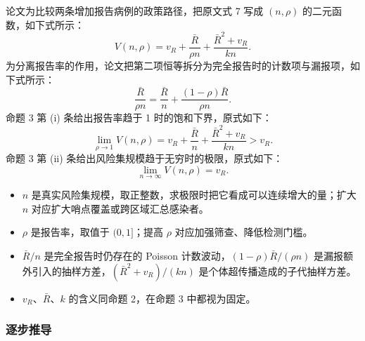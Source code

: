 论文为比较两条增加报告病例的政策路径，把原文式 7 写成 $(n,\rho)$ 的二元函数，如下式所示：
\begin{equation*}
V(n, \rho) = v_R + \frac{\bar{R}}{\rho n} + \frac{\bar{R}^2 + v_R}{k n}.
\tag{原文式 10}
\end{equation*}
为分离报告率的作用，论文把第二项恒等拆分为完全报告时的计数项与漏报项，如下式所示：
\begin{equation*}
\frac{\bar{R}}{\rho n} = \frac{\bar{R}}{n} + \frac{(1-\rho)\bar{R}}{\rho n}.
\tag{原文式 11}
\end{equation*}
命题 3 第 (i) 条给出报告率趋于 1 时的饱和下界，原式如下：
\begin{equation*}
\lim_{\rho \to 1} V(n, \rho) = v_R + \frac{\bar{R}}{n} + \frac{\bar{R}^2 + v_R}{k n} > v_R.
\tag{原文式 12}
\end{equation*}
命题 3 第 (ii) 条给出风险集规模趋于无穷时的极限，原式如下：
\begin{equation*}
\lim_{n \to \infty} V(n, \rho) = v_R.
\tag{原文式 13}
\end{equation*}

\begin{itemize}
\item $n$ 是真实风险集规模，取正整数，求极限时把它看成可以连续增大的量；扩大 $n$ 对应扩大哨点覆盖或跨区域汇总感染者。
\item $\rho$ 是报告率，取值于 $(0,1]$；提高 $\rho$ 对应加强筛查、降低检测门槛。
\item $\bar R/n$ 是完全报告时仍存在的 Poisson 计数波动，$(1-\rho)\bar R/(\rho n)$ 是漏报额外引入的抽样方差，$(\bar R^2+v_R)/(kn)$ 是个体超传播造成的子代抽样方差。
\item $v_R$、$\bar R$、$k$ 的含义同命题 2，在命题 3 中都视为固定。
\end{itemize}

\subsubsection{逐步推导}

